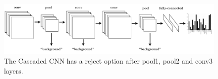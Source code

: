 \begin{figure}[h!]
\begin{center}
\includegraphics[width=0.98\columnwidth]{figures/ccnn.pdf}
\caption{
The Cascaded CNN has a reject option after pool1, pool2 and conv3 layers.
}\label{fig:ccnn}
\end{center}
\end{figure}



